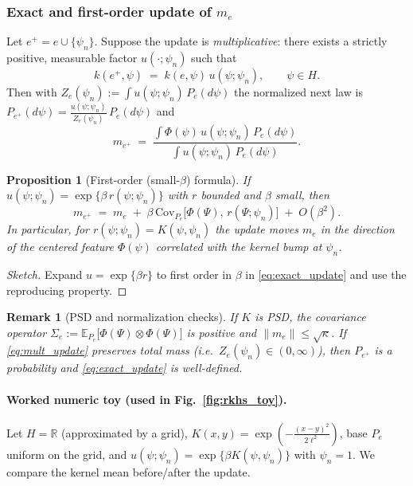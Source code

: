 \documentclass[12pt,a4paper]{article}
\newtheorem{proposition}{Proposition}
\newtheorem{remark}{Remark}
\begin{document}
\subsubsection*{Exact and first-order update of $m_e$}
Let $e^+=e\cup\{\psi_n\}$. Suppose the update is \emph{multiplicative}:
there exists a strictly positive, measurable factor $u(\cdot;\psi_n)$ such that
\begin{equation}\label{eq:mult_update}
  k(e^+,\psi) \;=\; k(e,\psi)\,u(\psi;\psi_n),\qquad \psi\in H.
\end{equation}
Then with $Z_e(\psi_n):=\int u(\psi;\psi_n)\,P_e(d\psi)$ the normalized next law is
$P_{e^+}(d\psi)=\frac{u(\psi;\psi_n)}{Z_e(\psi_n)}\,P_e(d\psi)$ and
\begin{equation}\label{eq:exact_update}
  m_{e^+} \;=\; \frac{\displaystyle \int \Phi(\psi)\,u(\psi;\psi_n)\,P_e(d\psi)}
                      {\displaystyle \int u(\psi;\psi_n)\,P_e(d\psi)}.
\end{equation}

\begin{proposition}[First-order (small-$\beta$) formula]\label{prop:first_order}
If $u(\psi;\psi_n)=\exp\!\{\beta\,r(\psi;\psi_n)\}$ with $r$ bounded and $\beta$ small, then
\begin{equation}\label{eq:first_order}
  m_{e^+} \;=\; m_e \;+\; \beta\,\mathrm{Cov}_{P_e}\!\big[\Phi(\Psi),\, r(\Psi;\psi_n)\big] \;+\; O(\beta^2).
\end{equation}
In particular, for $r(\psi;\psi_n)=K(\psi,\psi_n)$ the update moves $m_e$ in the direction of
the centered feature $\Phi(\psi)$ correlated with the kernel bump at $\psi_n$.
\end{proposition}

\begin{proof}[Sketch]
Expand $u=\exp\{\beta r\}$ to first order in $\beta$ in \eqref{eq:exact_update} and use the reproducing property.
\end{proof}

\begin{remark}[PSD and normalization checks]\label{rem:psd_norm}
If $K$ is PSD, the covariance operator $\Sigma_e:=\mathbb E_{P_e}\big[\Phi(\Psi)\otimes\Phi(\Psi)\big]$ is positive
and $\|m_e\|\le \sqrt{\kappa}$. If \eqref{eq:mult_update} preserves total mass (i.e.\ $Z_e(\psi_n)\in(0,\infty)$),
then $P_{e^+}$ is a probability and \eqref{eq:exact_update} is well-defined.
\end{remark}

\paragraph{Worked numeric toy (used in Fig.~\ref{fig:rkhs_toy}).}
Let $H=\mathbb R$ (approximated by a grid), $K(x,y)=\exp(-\tfrac{(x-y)^2}{2\ell^2})$, base $P_e$ uniform on the grid,
and $u(\psi;\psi_n)=\exp\{\beta K(\psi,\psi_n)\}$ with $\psi_n=1$. We compare the kernel mean before/after the update.
\end{document}
